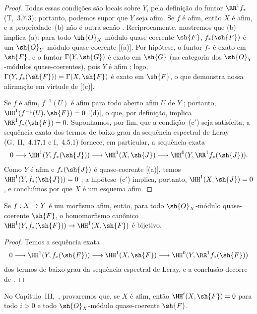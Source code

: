 \documentclass[oneside,10pt]{amsart}
\makeatletter
\newcommand{\ega@arrow}[2]{\mathchoice{#1}{#2}{#2}{#2}}
\renewcommand{\to}{\ega@arrow{\longrightarrow}{\rightarrow}}
\newcommand{\oldpage}[2][]{\marginnote{\normalfont\footnotesize\textbf{#1}~|~#2}\ignorespaces}
\let\EGAOriginalLabel\label
\renewcommand{\label}[1]{\phantomsection\EGAOriginalLabel{#1}}
\makeatother
\begin{document}
\begin{proof}
Todas essas condições são locais sobre $Y$, pela definição do funtor $\RR^1f_*$ (T,~3.7.3); portanto, podemos supor que $Y$ seja afim.
Se $f$ é afim, então $X$ é afim, e a propriedade~(b) não é outra senão .
Reciprocamente, mostremos que (b) implica (a):
para todo $\sh{O}_X$-módulo quase-coerente $\sh{F}$, $f_*(\sh{F})$ é um $\sh{O}_Y$-módulo quase-coerente [(a)].
Por hipótese, o funtor $f_*$ é exato em $\sh{F}$, e o funtor $\Gamma(Y,\sh{G})$ é exato em $\sh{G}$ (na categoria dos $\sh{O}_Y$-módulos quase-coerentes), pois $Y$ é afim ;
logo, $\Gamma(Y,f_*(\sh{F}))=\Gamma(X,\sh{F})$ é exato em $\sh{F}$, o que demonstra nossa afirmação em virtude de [(c)].

Se $f$ é afim, $f^{-1}(U)$ é afim para todo aberto afim $U$ de $Y$ ; portanto, $\HH^1(f^{-1}(U),\sh{F})=0$ [(d)], o que, por definição, implica $\RR^1f_*(\sh{F})=0$.
Suponhamos, por fim, que a condição~(c$'$) seja satisfeita;
a sequência exata dos termos de baixo grau da sequência espectral de Leray (G,~II,~4.17.1 e I,~4.5.1) fornece, em particular, a sequência exata
\[
  0\to\HH^1(Y,f_*(\sh{J}))\to\HH^1(X,\sh{J})\to\HH^0(Y,\RR^1f_*(\sh{J})).
\]
Como $Y$ é afim e $f_*(\sh{J})$ é quase-coerente [(a)], temos $\HH^1(Y,f_*(\sh{J}))=0$ ;
a hipótese~(c$'$) implica, portanto, $\HH^1(X,\sh{J})=0$, e concluímos por  que $X$ é um esquema afim.
\end{proof}

\begin{corollary}[5.2.3]
\label{II.5.2.3}
Se $f:X\to Y$ é um morfismo afim, então, para todo $\sh{O}_X$-módulo quase-coerente $\sh{F}$, o homomorfismo canônico $\HH^1(Y,f_*(\sh{F}))\to\HH^1(X,\sh{F})$ é bijetivo.
\end{corollary}

\oldpage[II]{99}
\begin{proof}
Temos a sequência exata
\[
  0\to\HH^1(Y,f_*(\sh{F}))\to\HH^1(X,\sh{F})\to\HH^0(Y,\RR^1f_*(\sh{F}))
\]
dos termos de baixo grau da sequência espectral de Leray, e a conclusão decorre de .
\end{proof}

\begin{remark}[5.2.4]
\label{II.5.2.4}
No Capítulo~III,~, provaremos que, se $X$ é afim, então $\HH^i(X,\sh{F})=0$ para todo $i>0$ e todo $\sh{O}_X$-módulo quase-coerente $\sh{F}$.
\end{remark}
\end{document}
